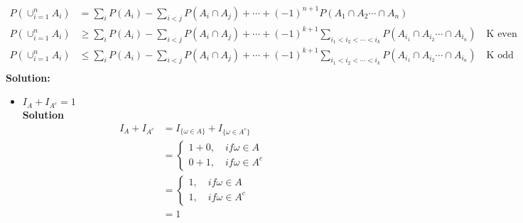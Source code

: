 \documentclass{article}
\begin{document}
\begin{enumerate}
\begin{align*}
        P(\cup_{i=1}^{n}A_i)&= \sum_{i}P(A_i)-\sum_{i<j}P(A_i \cap A_j)+ \cdots + (-1)^{n+1}P(A_1 \cap A_2 \cdots \cap A_n)\\
        P(\cup_{i=1}^{n}A_i)&\geq \sum_{i}P(A_i)-\sum_{i<j}P(A_i \cap A_j)+ \cdots + (-1)^{k+1}\sum_{i_1 <i_2 < \cdots < i_k}P(A_{i_1} \cap A_{i_2} \cdots \cap A_{i_n}) \quad \text{K even}\\
        P(\cup_{i=1}^{n}A_i)&\leq \sum_{i}P(A_i)-\sum_{i<j}P(A_i \cap A_j)+ \cdots + (-1)^{k+1}\sum_{i_1 <i_2 < \cdots < i_k}P(A_{i_1} \cap A_{i_2} \cdots \cap A_{i_n}) \quad \text{K odd}\\
    \end{align*}
    \textbf{Solution:}\\
    \begin{itemize}
        \item $I_A + I_{A^c}=1$ \\
        \textbf{Solution}
        \begin{align*}
            I_A + I_{A^c} &= I_{\{ \omega \in A\}} + I_{\{ \omega \in A^c \}}\\
            &= \begin{cases}
                1 + 0, \quad if \omega \in A\\
                0 + 1, \quad if \omega \in A^c
            \end{cases}\\
            &= \begin{cases}
                1 , \quad if \omega \in A\\
                1, \quad if \omega \in A^c
            \end{cases}\\
            &= 1
        \end{align*}
        

\end{itemize}
\end{enumerate}
\end{document}
